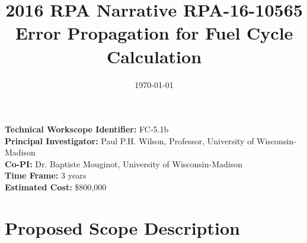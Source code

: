 \documentclass[dvips,12pt]{article}
\title{2016 RPA Narrative RPA-16-10565\\
Error Propagation for Fuel Cycle Calculation}
\date{\today}
\begin{document}
\maketitle 



\noindent\textbf{Technical Workscope Identifier:} FC-5.1b\\
\textbf{Principal Investigator:} Paul P.H. Wilson, Professor, University of Wisconsin-Madison\\
\textbf{Co-PI:} Dr. Baptiste Mouginot, University of Wisconsin-Madison\\
\textbf{Time Frame:} 3 years\\
\textbf{Estimated Cost:} \$800,000\\


\section{Proposed Scope Description}
\end{document}
